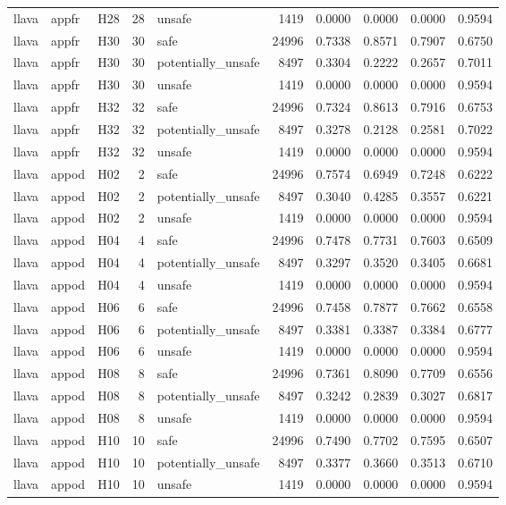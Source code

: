 \begin{table}[tbp]
\begin{tabular}{lllrlrrrrr}
llava & appfr & H28 & 28 & unsafe & 1419 & 0.0000 & 0.0000 & 0.0000 & 0.9594 \\
llava & appfr & H30 & 30 & safe & 24996 & 0.7338 & 0.8571 & 0.7907 & 0.6750 \\
llava & appfr & H30 & 30 & potentially\_unsafe & 8497 & 0.3304 & 0.2222 & 0.2657 & 0.7011 \\
llava & appfr & H30 & 30 & unsafe & 1419 & 0.0000 & 0.0000 & 0.0000 & 0.9594 \\
llava & appfr & H32 & 32 & safe & 24996 & 0.7324 & 0.8613 & 0.7916 & 0.6753 \\
llava & appfr & H32 & 32 & potentially\_unsafe & 8497 & 0.3278 & 0.2128 & 0.2581 & 0.7022 \\
llava & appfr & H32 & 32 & unsafe & 1419 & 0.0000 & 0.0000 & 0.0000 & 0.9594 \\
llava & appod & H02 & 2 & safe & 24996 & 0.7574 & 0.6949 & 0.7248 & 0.6222 \\
llava & appod & H02 & 2 & potentially\_unsafe & 8497 & 0.3040 & 0.4285 & 0.3557 & 0.6221 \\
llava & appod & H02 & 2 & unsafe & 1419 & 0.0000 & 0.0000 & 0.0000 & 0.9594 \\
llava & appod & H04 & 4 & safe & 24996 & 0.7478 & 0.7731 & 0.7603 & 0.6509 \\
llava & appod & H04 & 4 & potentially\_unsafe & 8497 & 0.3297 & 0.3520 & 0.3405 & 0.6681 \\
llava & appod & H04 & 4 & unsafe & 1419 & 0.0000 & 0.0000 & 0.0000 & 0.9594 \\
llava & appod & H06 & 6 & safe & 24996 & 0.7458 & 0.7877 & 0.7662 & 0.6558 \\
llava & appod & H06 & 6 & potentially\_unsafe & 8497 & 0.3381 & 0.3387 & 0.3384 & 0.6777 \\
llava & appod & H06 & 6 & unsafe & 1419 & 0.0000 & 0.0000 & 0.0000 & 0.9594 \\
llava & appod & H08 & 8 & safe & 24996 & 0.7361 & 0.8090 & 0.7709 & 0.6556 \\
llava & appod & H08 & 8 & potentially\_unsafe & 8497 & 0.3242 & 0.2839 & 0.3027 & 0.6817 \\
llava & appod & H08 & 8 & unsafe & 1419 & 0.0000 & 0.0000 & 0.0000 & 0.9594 \\
llava & appod & H10 & 10 & safe & 24996 & 0.7490 & 0.7702 & 0.7595 & 0.6507 \\
llava & appod & H10 & 10 & potentially\_unsafe & 8497 & 0.3377 & 0.3660 & 0.3513 & 0.6710 \\
llava & appod & H10 & 10 & unsafe & 1419 & 0.0000 & 0.0000 & 0.0000 & 0.9594 \\

\end{tabular}
\end{table}
